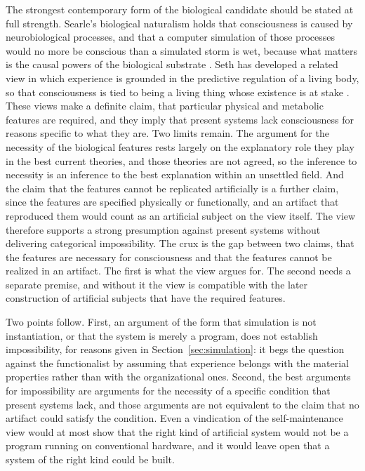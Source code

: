\documentclass[12pt]{article}
\theoremstyle{definition}
\begin{document}
The strongest contemporary form of the biological candidate should be stated at full strength. Searle's biological naturalism holds that consciousness is caused by neurobiological processes, and that a computer simulation of those processes would no more be conscious than a simulated storm is wet, because what matters is the causal powers of the biological substrate \cite{searle1980,searle1992}. Seth has developed a related view in which experience is grounded in the predictive regulation of a living body, so that consciousness is tied to being a living thing whose existence is at stake \cite{seth2021}. These views make a definite claim, that particular physical and metabolic features are required, and they imply that present systems lack consciousness for reasons specific to what they are. Two limits remain. The argument for the necessity of the biological features rests largely on the explanatory role they play in the best current theories, and those theories are not agreed, so the inference to necessity is an inference to the best explanation within an unsettled field. And the claim that the features cannot be replicated artificially is a further claim, since the features are specified physically or functionally, and an artifact that reproduced them would count as an artificial subject on the view itself. The view therefore supports a strong presumption against present systems without delivering categorical impossibility. The crux is the gap between two claims, that the features are necessary for consciousness and that the features cannot be realized in an artifact. The first is what the view argues for. The second needs a separate premise, and without it the view is compatible with the later construction of artificial subjects that have the required features.

Two points follow. First, an argument of the form that simulation is not instantiation, or that the system is merely a program, does not establish impossibility, for reasons given in Section~\ref{sec:simulation}: it begs the question against the functionalist by assuming that experience belongs with the material properties rather than with the organizational ones. Second, the best arguments for impossibility are arguments for the necessity of a specific condition that present systems lack, and those arguments are not equivalent to the claim that no artifact could satisfy the condition. Even a vindication of the self-maintenance view would at most show that the right kind of artificial system would not be a program running on conventional hardware, and it would leave open that a system of the right kind could be built.
\end{document}
